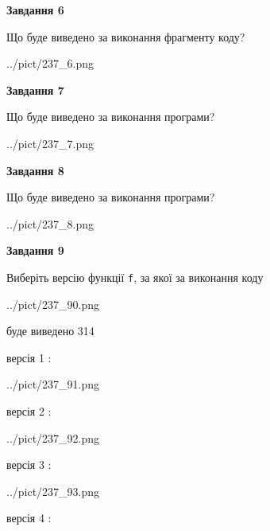 \documentclass[12pt, ukrainian]{article}
\def\code#1{\Verb!#1!}
\begin{document}
{\begin {large}
{\begin {center}\textbf{Завдання 6}\end {center}}

Що буде виведено за виконання фрагменту коду?\par
\begin{center}
	{../pict/237_6.png}
\end{center}
\newpage

{\begin {center}\textbf{Завдання 7}\end {center}}

Що буде виведено за виконання програми?\par
\begin{center}
	{../pict/237_7.png}
\end{center}
\newpage

{\begin {center}\textbf{Завдання 8}\end {center}}

Що буде виведено за виконання програми?\par
\begin{center}
	{../pict/237_8.png}
\end{center}
\newpage

{\begin {center}\textbf{Завдання 9}\end {center}}

Виберіть версію функції \code{f}, за якої за виконання коду
\begin{center}
	{../pict/237_90.png}
\end{center}
буде виведено 314

\vspace{5mm}
версія 1 :

\begin{center}
	{../pict/237_91.png}
\end{center}
версія 2 :

\begin{center}
	{../pict/237_92.png}
\end{center}
версія 3 :

\begin{center}
	{../pict/237_93.png}
\end{center}
версія 4 :


\end{large}}
\end{document}
